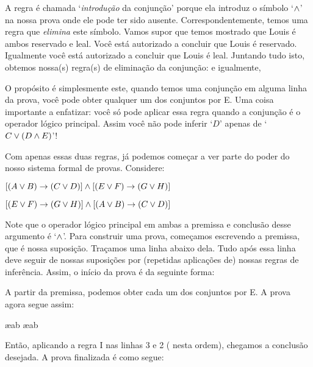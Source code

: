 A regra \'e chamada `\emph{introdu\c c\~ao} da conjun\c c\~ao'  porque  ela introduz  o s\'imbolo `$\wedge$' na nossa  prova onde ele pode ter sido ausente.  Correspondentemente,  temos uma regra que \emph{elimina}  este  s\'imbolo.  Vamos supor que temos mostrado que Louis \'e ambos  reservado e  leal.  Voc\^e   est\'a autorizado a concluir que Louis   \'e reservado. Igualmente voc\^e   est\'a autorizado a concluir que Louis   \'e leal.  Juntando tudo isto, obtemos nossa(s) regra(s) de elimina\c c\~ao da conjun\c c\~ao:
e igualmente, 

 
O prop\'osito \'e simplesmente este,  quando temos uma conjun\c c\~ao em alguma linha da prova, voc\^e pode obter qualquer um dos conjuntos  por {\eand}E.  Uma coisa importante a enfatizar:  voc\^e s\'o pode aplicar essa regra quando a conjun\c c\~ao \'e o operador l\'ogico principal. Assim voc\^e n\~ao pode inferir `$D$'  apenas de `$C \vee (D \wedge E)$'!

Com apenas essas duas regras, j\'a podemos come\c car a ver parte do poder do nosso sistema formal de provas.  Considere: 
\begin{earg}
\item[] $[(A\vee B)\rightarrow(C\vee D)] \wedge [(E \vee F) \rightarrow (G\vee H)]$
\item[\therefore] $[(E \vee F) \rightarrow (G\vee H)] \wedge [(A\vee B)\rightarrow(C\vee D)]$
\end{earg}
Note que o operador l\'ogico principal em ambas a premissa e conclus\~ao  desse argumento \'e `$\wedge$'.  Para construir uma prova, come\c camos escrevendo a premissa, que \'e nossa suposi\c c\~ao. Tra\c camos uma linha abaixo dela. Tudo ap\'os essa linha deve seguir de nossas suposi\c c\~oes por  (repetidas aplica\c c\~oes de) nossas regras de infer\^encia. Assim, o in\'icio da prova \'e da seguinte forma: 
\begin{fitchproof}
\end{fitchproof}
A partir da premissa, podemos obter cada um dos conjuntos por  {\eand}E. A prova agora segue assim: 
\begin{fitchproof}
	 \ae{ab}
	 \ae{ab}
\end{fitchproof}
Ent\~ao, aplicando a regra {\eand}I  nas linhas 3 e 2 ( nesta ordem), chegamos a conclus\~ao desejada. A  prova finalizada \'e como segue:


